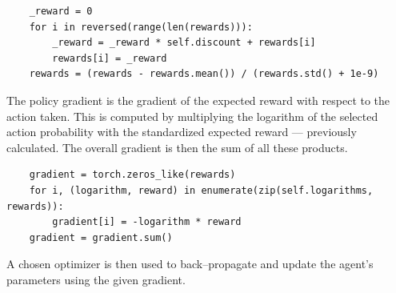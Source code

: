 \documentclass{article}
\let\oldcite\cite
\renewcommand{\cite}[1]{\textbf{\oldcite{#1}}}
\renewenvironment{leftbar}[1][\hsize]{
    \def\FrameCommand{{\color{barcolor}\vrule width 0.5pt \hspace{10pt}}}
    \MakeFramed{\hsize#1 \advance\hsize-\width \FrameRestore}
}{\endMakeFramed}
\begin{document}
\begin{leftbar}
\begin{lstlisting}
    _reward = 0
    for i in reversed(range(len(rewards))):
        _reward = _reward * self.discount + rewards[i]
        rewards[i] = _reward
    rewards = (rewards - rewards.mean()) / (rewards.std() + 1e-9)
    \end{lstlisting}

    The policy gradient is the gradient of the expected reward with respect to the action taken. This is computed by multiplying the logarithm of the selected action probability with the standardized expected reward — previously calculated. The overall gradient is then the sum of all these products.

    \begin{lstlisting}
    gradient = torch.zeros_like(rewards)
    for i, (logarithm, reward) in enumerate(zip(self.logarithms, rewards)):
        gradient[i] = -logarithm * reward
    gradient = gradient.sum()
    \end{lstlisting}

    A chosen optimizer is then used to back–propagate and update the agent's parameters using the given gradient. \cite{REINFORCE}

\end{leftbar}
\end{document}
